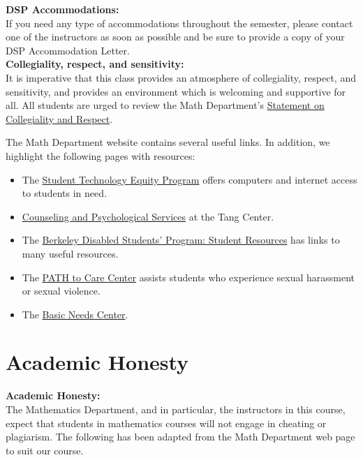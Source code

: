 \documentclass[11pt, a4paper]{article}
\begin{document}
\noindent\textbf{DSP Accommodations:} \\
If you need any type of accommodations throughout the semester, please contact one of the instructors as soon as possible and be sure to provide a copy of your DSP Accommodation Letter. \\

\noindent\textbf{Collegiality, respect, and sensitivity:} \\
It is imperative that this class provides an atmosphere of collegiality, respect, and sensitivity, and provides an environment which is welcoming and supportive for all. All students are urged to review the Math Department's \href{https://math.berkeley.edu/about}{Statement on Collegiality and Respect}.

The Math Department website contains several useful links. In addition, we highlight the following pages with resources:
\begin{itemize}
    \item The \href{https://technology.berkeley.edu/STEP}{Student Technology Equity Program} offers computers and internet access to students in need.
    \item \href{https://uhs.berkeley.edu/caps}{Counseling and Psychological Services} at the Tang Center.
    \item The \href{https://dsp.berkeley.edu/students/student-resources}{Berkeley Disabled Students' Program: Student Resources} has links to many useful resources.
    \item The \href{https://care.berkeley.edu/}{PATH to Care Center} assists students who experience sexual harassment or sexual violence.
    \item The \href{https://basicneeds.berkeley.edu/}{Basic Needs Center}.
\end{itemize}


\section*{Academic Honesty}
\noindent\textbf{Academic Honesty:} \\ 
The Mathematics Department, and in particular, the instructors in this course, expect that students in mathematics courses will not engage in cheating or plagiarism. The following has been adapted from the Math Department web page to suit our course. \\
\end{document}
